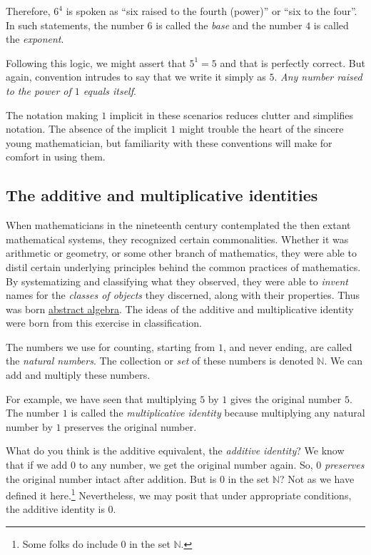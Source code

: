 \documentclass[
  a4paper,
]{article}
\begin{document}
Therefore, \(6^4\) is spoken as ``six raised to the fourth (power)'' or
``six to the four''. In such statements, the number \(6\) is called the
\emph{base} and the number \(4\) is called the \emph{exponent}.

Following this logic, we might assert that \(5^1 = 5\) and that is
perfectly correct. But again, convention intrudes to say that we write
it simply as \(5\). \emph{Any number raised to the power of \(1\) equals
itself}.

The notation making \(1\) implicit in these scenarios reduces clutter
and simplifies notation. The absence of the implicit \(1\) might trouble
the heart of the sincere young mathematician, but familiarity with these
conventions will make for comfort in using them.

\hypertarget{the-additive-and-multiplicative-identities}{%
\subsection{The additive and multiplicative
identities}\label{the-additive-and-multiplicative-identities}}

When mathematicians in the nineteenth century contemplated the then
extant mathematical systems, they recognized certain commonalities.
Whether it was arithmetic or geometry, or some other branch of
mathematics, they were able to distil certain underlying principles
behind the common practices of mathematics. By systematizing and
classifying what they observed, they were able to \emph{invent} names
for the \emph{classes of objects} they discerned, along with their
properties. Thus was born
\href{https://en.wikipedia.org/wiki/Abstract_algebra}{abstract algebra}.
The ideas of the additive and multiplicative identity were born from
this exercise in classification.

The numbers we use for counting, starting from \(1\), and never ending,
are called the \emph{natural numbers}. The collection or \emph{set} of
these numbers is denoted \(\mathbb{N}\). We can add and multiply these
numbers.

For example, we have seen that multiplying \(5\) by \(1\) gives the
original number \(5\). The number \(1\) is called the
\emph{multiplicative identity} because multiplying any natural number by
\(1\) preserves the original number.

What do you think is the additive equivalent, the \emph{additive
identity}? We know that if we add \(0\) to any number, we get the
original number again. So, \(0\) \emph{preserves} the original number
intact after addition. But is \(0\) in the set \(\mathbb{N}\)? Not as we
have defined it here.\footnote{Some folks do include \(0\) in the set
  \(\mathbb{N}\).} Nevertheless, we may posit that under appropriate
conditions, the additive identity is \(0\).
\end{document}
